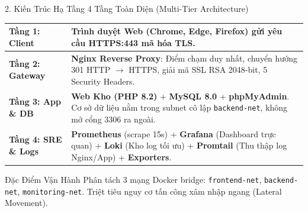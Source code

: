 \documentclass[aspectratio=169,10pt]{beamer}
\begin{document}
\begin{frame}{2. Kiến Trúc Hạ Tầng 4 Tầng Toàn Diện (Multi-Tier Architecture)}
    \begin{center}
        \begin{tabular}{|p{}|p{}|}
            \hline
            \textbf{Tầng 1: Client} & Trình duyệt Web (Chrome, Edge, Firefox) gửi yêu cầu HTTPS:443 mã hóa TLS. \\
            \hline
            \textbf{Tầng 2: Gateway} & \textbf{Nginx Reverse Proxy}: Điểm chạm duy nhất, chuyển hướng 301 HTTP $\to$ HTTPS, giải mã SSL RSA 2048-bit, 5 Security Headers. \\
            \hline
            \textbf{Tầng 3: App \& DB} & \textbf{Web Kho (PHP 8.2)} + \textbf{MySQL 8.0} + \textbf{phpMyAdmin}. Cơ sở dữ liệu nằm trong subnet cô lập \texttt{backend-net}, không mở cổng 3306 ra ngoài. \\
            \hline
            \textbf{Tầng 4: SRE \& Logs} & \textbf{Prometheus} (scrape 15s) + \textbf{Grafana} (Dashboard trực quan) + \textbf{Loki} (Kho log tối ưu) + \textbf{Promtail} (Thu thập log Nginx/App) + \textbf{Exporters}. \\
            \hline
        \end{tabular}
    \end{center}
    \vspace{4pt}
    \begin{exampleblock}{Đặc Điểm Vận Hành}
        Phân tách 3 mạng Docker bridge: \texttt{frontend-net}, \texttt{backend-net}, \texttt{monitoring-net}. Triệt tiêu nguy cơ tấn công xâm nhập ngang (Lateral Movement).
    \end{exampleblock}
\end{frame}
\end{document}
